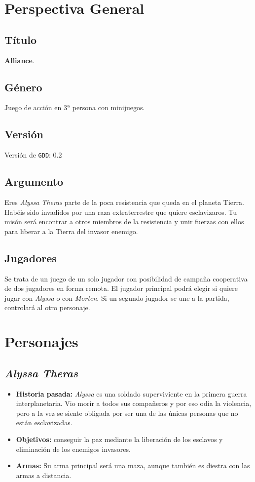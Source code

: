 \documentclass[11pt, twoside]{article}
\begin{document}
\pagestyle{insection}
\section{Perspectiva General}

\subsection{Título}
\textbf{Alliance}.

\subsection{Género}
Juego de acción en $3ª$ persona con minijuegos.

\subsection{Versión}
Versión de \texttt{GDD}: 0.2

\subsection{Argumento}
Eres \textit{Alyssa Theras} parte de la poca resistencia que queda en el planeta Tierra. Habéis sido invadidos por una raza extraterrestre que quiere esclavizaros. Tu misón será encontrar a otros miembros de la resistencia y unir fuerzas con ellos para liberar a la Tierra del invasor enemigo. 

\subsection{Jugadores}
Se trata de un juego de un solo jugador con posibilidad de campaña cooperativa de dos jugadores en forma remota. El jugador principal podrá elegir si quiere jugar con \textit{Alyssa} o con \textit{Morten}. Si un segundo jugador se une a la partida, controlará al otro personaje.

\newpage

\pagestyle{insection}
\section{Personajes}

\subsection{\textit{Alyssa Theras}}
\begin{itemize}
\item \textbf{Historia pasada:} \textit{Alyssa} es una soldado superviviente en la primera guerra interplanetaria. Vio morir a todos sus compañeros y por eso odia la violencia, pero a la vez se siente obligada por ser una de las únicas personas que no están esclavizadas. 
\item \textbf{Objetivos:} conseguir la paz mediante la liberación de los esclavos y eliminación de los enemigos invasores.
\item \textbf{Armas:} Su arma principal será una maza, aunque también es diestra con las armas a distancia. 
\end{itemize}
\end{document}
